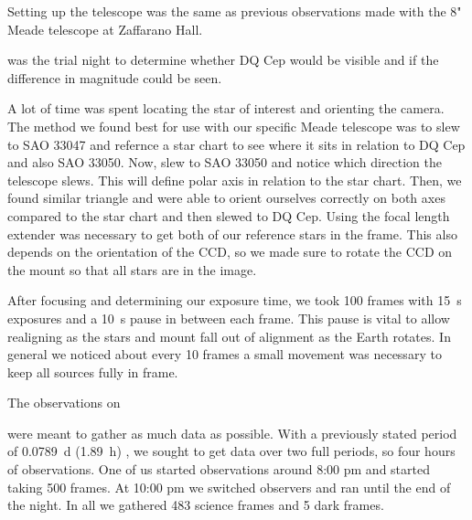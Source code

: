 \documentclass[%
aip,
jmp,
reprint,
floatfix,
nofootinbib
]{revtex4-1}
\begin{document}
	Setting up the telescope was the same as previous observations made with the 8" Meade telescope at Zaffarano Hall. \date{27 September 2017} was the trial night to determine whether DQ Cep would be visible and if the difference in magnitude could be seen. 
	
	A lot of time was spent locating the star of interest and orienting the camera. The method we found best for use with our specific Meade telescope was to slew to SAO 33047 and refernce a star chart to see where it sits in relation to DQ Cep and also SAO 33050. Now, slew to SAO 33050 and notice which direction the telescope slews. This will define polar axis in relation to the star chart. Then, we found similar triangle and were able to orient ourselves correctly on both axes compared to the star chart and then slewed to DQ Cep. Using the focal length extender was necessary to get both of our reference stars in the frame. This also depends on the orientation of the CCD, so we made sure to rotate the CCD on the mount so that all stars are in the image. 
	
	After focusing and determining our exposure time, we took 100 frames with \SI{15}{\second} exposures and a \SI{10}{\second} pause in between each frame. This pause is vital to allow realigning as the stars and mount fall out of alignment as the Earth rotates. In general we noticed about every 10 frames a small movement was necessary to keep all sources fully in frame.
	
	The observations on \date{18 October 2017} were meant to gather as much data as possible. With a previously stated period of \SI{.0789}{\day} (\SI{1.89}{\hour}) \cite{1971GCVS3.C......0K}, we sought to get data over two full periods, so four hours of observations. One of us started observations around 8:00 pm and started taking 500 frames. At 10:00 pm we switched observers and ran until the end of the night. In all we gathered 483 science frames and 5 dark frames.
	
	
	

\end{document}
